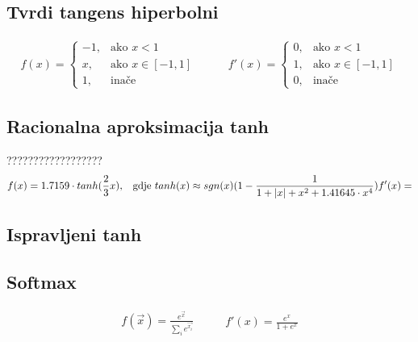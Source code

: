 \documentclass[times, utf8, diplomski]{fer}
\begin{document}
\subsection*{Tvrdi tangens hiperbolni}

\begin{equation}
\begin{split}
f(x) =
\begin{cases}
-1,	 		& \text{ako } x < 1 \\
x,	 		& \text{ako } x \in [-1,1] \\
1,	& \text{inače}
\end{cases}
\end{split}
\qquad
\begin{split}
f'(x) =
\begin{cases}
0,	 		& \text{ako } x < 1 \\
1,	 		& \text{ako } x \in [-1,1] \\
0,	& \text{inače}
\end{cases}
\end{split}
\end{equation}

\subsection*{Racionalna aproksimacija tanh}
??????????????????
\begin{equation}
f(x) = 1.7159 \cdot tanh(\frac{2}{3}x)\text{,\quad gdje }
tanh(x) \approx sgn(x)(1 - \frac{1}{1 + |x| + x^2 + 1.41645 \cdot x^4}) \\
f'(x) =
\end{equation}

\subsection*{Ispravljeni tanh}

\subsection*{Softmax}
\begin{equation}
\begin{split}
f(\vec{x}) = \frac{e^{\vec{x}}}{\sum_ie^{\vec{x_i}}}
\end{split}
\qquad
\begin{split}
f'(x) = \frac{e^x}{1+e^x}
\end{split}
\end{equation}
\end{document}
